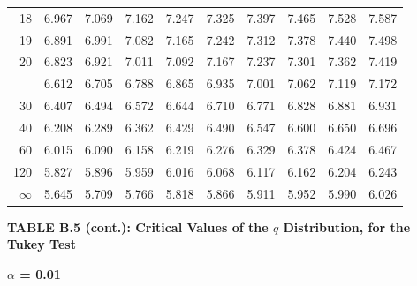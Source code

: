 \documentclass[10pt]{article}
\begin{document}
\begin{longtable}{@{}r!{\vrule width 0.8pt\hspace{0.55em}}rrrrrrrrr@{}}
18 & 6.967 & 7.069 & 7.162 & 7.247 & 7.325 & 7.397 & 7.465 & 7.528 & 7.587 \\
19 & 6.891 & 6.991 & 7.082 & 7.165 & 7.242 & 7.312 & 7.378 & 7.440 & 7.498 \\
20 & 6.823 & 6.921 & 7.011 & 7.092 & 7.167 & 7.237 & 7.301 & 7.362 & 7.419 \\
 & 6.612 & 6.705 & 6.788 & 6.865 & 6.935 & 7.001 & 7.062 & 7.119 & 7.172 \\
30 & 6.407 & 6.494 & 6.572 & 6.644 & 6.710 & 6.771 & 6.828 & 6.881 & 6.931 \\
40 & 6.208 & 6.289 & 6.362 & 6.429 & 6.490 & 6.547 & 6.600 & 6.650 & 6.696 \\
60 & 6.015 & 6.090 & 6.158 & 6.219 & 6.276 & 6.329 & 6.378 & 6.424 & 6.467 \\
120 & 5.827 & 5.896 & 5.959 & 6.016 & 6.068 & 6.117 & 6.162 & 6.204 & 6.243 \\
\addlinespace[0.30em]
$\infty$ & 5.645 & 5.709 & 5.766 & 5.818 & 5.866 & 5.911 & 5.952 & 5.990 & 6.026 \\
\end{longtable}
\newpage
\thispagestyle{empty}
\begin{center}
{\large\bfseries TABLE B.5 (cont.): Critical Values of the $q$ Distribution, for the Tukey Test\par}
\end{center}
{\large\bfseries $\alpha$ = 0.01\par}
\vspace{0.45em}
\small
\end{document}
